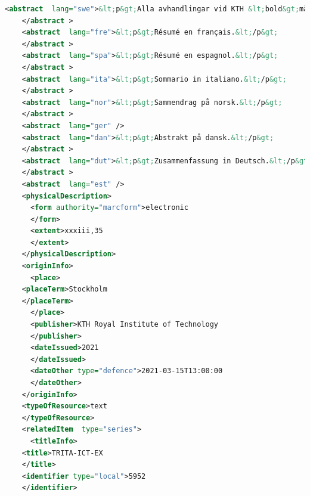 \begin{lstlisting}[language={XML}, caption={test12.mods (reformatted in EMACS using XML mode)}, label=lst:test12.mods]
    <abstract  lang="swe">&lt;p&gt;Alla avhandlingar vid KTH &lt;bold&gt;måste ha&lt;/bold&gt; ett abstrakt på både &lt;i&gt;engelska&lt;/i&gt; och &lt;i&gt;svenska&lt;/i&gt;.&lt;/p&gt;&lt;p&gt;Om du skriver din avhandling på svenska ska detta göras först (och placera det som det första abstraktet) - och du bör revidera det vid behov.&lt;/p&gt;&lt;p&gt;If you are writing your thesis in English, you can leave this until the draft version that goes to your opponent for the written opposition. In this way you can provide the English and Swedish abstract/summary information that can be used in the announcement for your oral presentation.&lt;/p&gt;&lt;p&gt;If you are writing your thesis in English, then this section can be a summary targeted at a more general reader. However, if you are writing your thesis in Swedish, then the reverse is true – your abstract should be for your target audience, while an English summary can be written targeted at a more general audience.&lt;/p&gt;&lt;p&gt;This means that the English abstract and Swedish sammnfattning or Swedish abstract and English summary need not be literal translations of each other.&lt;/p&gt;&lt;p&gt;The abstract in the language used for the thesis should be the first abstract, while the Summary/Sammanfattning in the other language can follow.&lt;/p&gt;
    </abstract >
    <abstract  lang="fre">&lt;p&gt;Résumé en français.&lt;/p&gt;
    </abstract >
    <abstract  lang="spa">&lt;p&gt;Résumé en espagnol.&lt;/p&gt;
    </abstract >
    <abstract  lang="ita">&lt;p&gt;Sommario in italiano.&lt;/p&gt;
    </abstract >
    <abstract  lang="nor">&lt;p&gt;Sammendrag på norsk.&lt;/p&gt;
    </abstract >
    <abstract  lang="ger" />
    <abstract  lang="dan">&lt;p&gt;Abstrakt på dansk.&lt;/p&gt;
    </abstract >
    <abstract  lang="dut">&lt;p&gt;Zusammenfassung in Deutsch.&lt;/p&gt;&lt;p&gt;Samenvatting in het Nederlands.&lt;/p&gt;&lt;p&gt;Eesti keeles kokkuvõte.&lt;/p&gt;
    </abstract >
    <abstract  lang="est" />
    <physicalDescription>
      <form authority="marcform">electronic
      </form>
      <extent>xxxiii,35
      </extent>
    </physicalDescription>
    <originInfo>
      <place>
	<placeTerm>Stockholm
	</placeTerm>
      </place>
      <publisher>KTH Royal Institute of Technology
      </publisher>
      <dateIssued>2021
      </dateIssued>
      <dateOther type="defence">2021-03-15T13:00:00
      </dateOther>
    </originInfo>
    <typeOfResource>text
    </typeOfResource>
    <relatedItem  type="series">
      <titleInfo>
	<title>TRITA-ICT-EX
	</title>
	<identifier type="local">5952
	</identifier>

\end{lstlisting}
